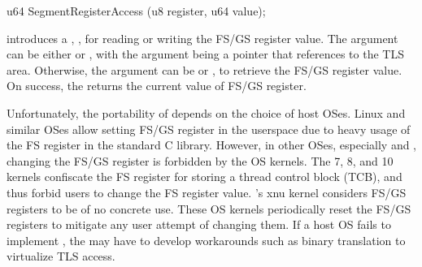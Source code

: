 



\begin{paldef}
u64 SegmentRegisterAccess (u8 register, u64 value);
\end{paldef}




\Thehostabi{} introduces a \hostapi{}, , for reading or writing the FS/GS register value.
The  argument can be either  or ,
with the  argument
being a pointer that references to the TLS area.
Otherwise, the  argument
can be  or ,
to retrieve the FS/GS register value.
On success, the \hostapi{} returns the current value of FS/GS register.



Unfortunately, the portability of 
depends on the choice of host OSes.
Linux and similar OSes allow setting FS/GS register in the userspace due to heavy usage of the FS register in the standard C library.
However, in other OSes, especially \win{} and \osx{},
changing the FS/GS register %
is forbidden by the OS kernels.
The \win{} 7, 8, and 10 kernels confiscate the FS register for storing a thread control block (TCB),
and thus forbid users to change the FS register value.
\osx{}'s xnu kernel considers FS/GS registers to be of no concrete use.
These OS kernels
periodically reset the FS/GS registers
to mitigate any user attempt
of changing them.
If a host OS fails to implement ,
the \libos{} may have to develop workarounds such as binary translation
to virtualize TLS access.


